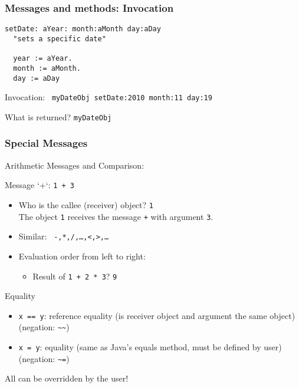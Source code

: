 \documentclass{beamer}
\newcommand{\Blue}[1]{\color{blue}#1\color{black}}
\begin{document}

\begin{frame}[fragile]
\frametitle{Messages and methods: Invocation}

\begin{example}
\begin{lstlisting}[language=Smalltalk]
setDate: aYear: month:aMonth day:aDay 
  "sets a specific date"

  year := aYear.
  month := aMonth.
  day := aDay
\end{lstlisting}
\end{example}

Invocation:
\lstinline[language=Smalltalk]+ myDateObj setDate:2010 month:11 day:19+

\pause\bigskip

What is returned? \pause \texttt{myDateObj}

\end{frame}


\begin{frame}[fragile]
\frametitle{Special Messages}


\Blue{Arithmetic Messages and Comparison}:

Message `+`: \texttt{1 + 3}

\begin{itemize}
\item Who is the callee (receiver) object? \pause \texttt{1}\\
  The object \texttt{1} receives the message \texttt{+} with argument \texttt{3}.
\item Similar: \texttt{ -,*,/,\ldots,<,>,\ldots}
\item Evaluation order from left to right:
  \begin{itemize}
    \item Result of \texttt{1 + 2 * 3}? \pause \alert{\texttt{9}}
  \end{itemize}
\end{itemize}

\Blue{Equality}

\begin{itemize}
\item \texttt{x == y}: reference equality (is receiver object and
  argument the same object) (negation: \verb+~~+)
\item \texttt{x = y}: equality (same as Java's equals method, must be
  defined by user) (negation: \verb+~=+)
\end{itemize}
\pause

All can be overridden by the user!

\end{frame}
\end{document}
